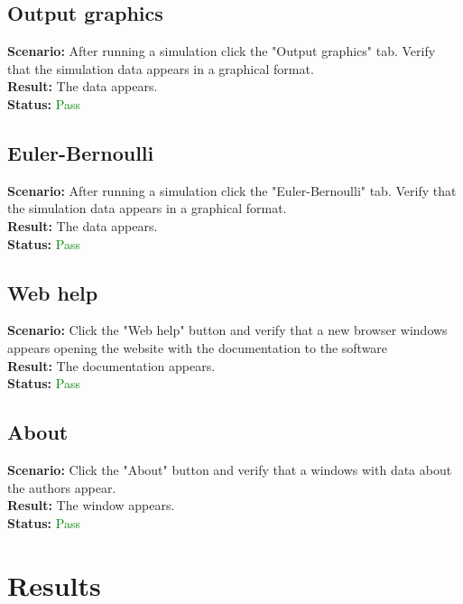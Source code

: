 \documentclass[a4paper, 11pt, article]{report}
\begin{document}
\subsection{Output graphics}

\noindent \textbf{Scenario:} After running a simulation click the "Output graphics" tab. Verify that the simulation data appears in a graphical format.
\\
\noindent \textbf{Result:} The data appears.
\\
\noindent \textbf{Status:} \textcolor{green}{Pass}

\subsection{Euler-Bernoulli}

\noindent \textbf{Scenario:} After running a simulation click the "Euler-Bernoulli" tab. Verify that the simulation data appears in a graphical format.
\\
\noindent \textbf{Result:} The data appears.
\\
\noindent \textbf{Status:} \textcolor{green}{Pass}

\subsection{Web help}

\noindent \textbf{Scenario:} Click the "Web help" button and verify that a new browser windows appears opening the website with the documentation to the software
\\
\noindent \textbf{Result:} The documentation appears.
\\
\noindent \textbf{Status:} \textcolor{green}{Pass}

\subsection{About}

\noindent \textbf{Scenario:} Click the "About" button and verify that a windows with data about the authors appear.
\\
\noindent \textbf{Result:} The window appears.
\\
\noindent \textbf{Status:} \textcolor{green}{Pass}

\section{Results}
\end{document}
